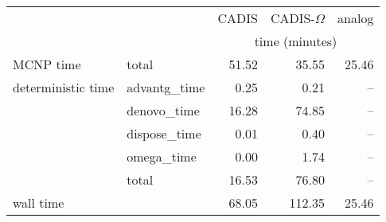 \begin{tabular}{llrrr}
\toprule
          &             &          CADIS & CADIS-$\Omega$ &         analog \\
        &              & \multicolumn{3}{c}{time (minutes)} \\
\midrule
MCNP time & total &          51.52 &          35.55 &          25.46 \\
deterministic time & advantg\_time &           0.25 &           0.21 &            -- \\
          & denovo\_time &          16.28 &          74.85 &            -- \\
          & dispose\_time &           0.01 &           0.40 &            -- \\
          & omega\_time &           0.00 &           1.74 &            -- \\
          & total &          16.53 &          76.80 &            -- \\
wall time &              &          68.05 &         112.35 &          25.46 \\
\bottomrule
\end{tabular}
